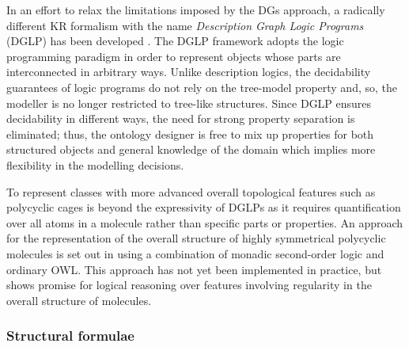 \documentclass[10pt]{bmc_article}
\newenvironment{bmcformat}{\baselineskip20pt\sloppy\setboolean{publ}{false}}{\baselineskip20pt\sloppy}
\begin{document}
\begin{bmcformat}
In an effort to relax the limitations imposed by the DGs approach, a radically different KR formalism with the name \emph{Description Graph Logic Programs} (DGLP) has been developed \cite{magka2011}. The DGLP framework adopts the logic programming paradigm in order to represent objects whose parts are interconnected in arbitrary ways. Unlike description logics, the decidability guarantees of logic programs do not rely on the tree-model property and, so, the modeller is no longer restricted to tree-like structures. Since DGLP ensures decidability in different ways, the need for strong property separation is eliminated; thus, the ontology designer is free to mix up properties for both structured objects and general knowledge of the domain which implies more flexibility in the  modelling decisions.  


% 
%  
% 

To represent classes with more advanced overall topological features such as polycyclic cages is beyond the expressivity of DGLPs as it requires quantification over all atoms in a molecule rather than specific parts or properties. An approach for the representation of the overall structure of highly symmetrical polycyclic molecules is set out in \cite{hastings2011} using a combination of monadic second-order logic and ordinary OWL.  This approach has not yet been implemented in practice, but shows promise for logical reasoning over features involving regularity in the overall structure of molecules. 
  
\subsubsection*{Structural formulae}  
\label{subsubsec:entire}


\end{bmcformat}
\end{document}
